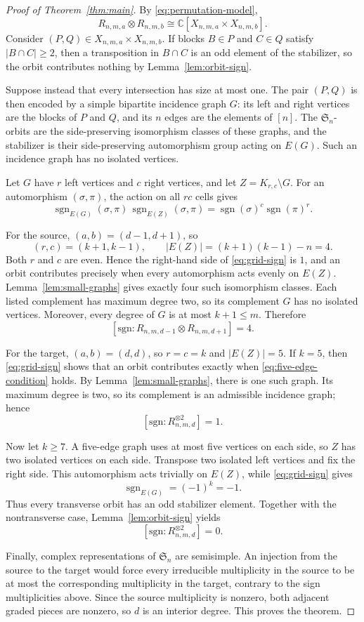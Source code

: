 \documentclass[11pt]{amsart}
\newcommand{\C}{\mathbb C}
\newcommand{\signrep}{\mathrm{sgn}}
\newcommand{\smult}[1]{[\signrep:#1]}
\DeclareMathOperator{\sgn}{sgn}
\begin{document}
\begin{proof}[Proof of Theorem~\ref{thm:main}]
By \eqref{eq:permutation-model},
\[
  R_{n,m,a}\otimes R_{n,m,b}
  \cong \C[X_{n,m,a}\times X_{n,m,b}].
\]
Consider $(P,Q)\in X_{n,m,a}\times X_{n,m,b}$. If blocks
$B\in P$ and $C\in Q$ satisfy $|B\cap C|\ge2$, then a transposition in
$B\cap C$ is an odd element of the stabilizer, so the orbit contributes
nothing by Lemma~\ref{lem:orbit-sign}.

Suppose instead that every intersection has size at most one. The pair
$(P,Q)$ is then encoded by a simple bipartite incidence graph $G$: its
left and right vertices are the blocks of $P$ and $Q$, and its $n$
edges are the elements of $[n]$. The $\mathfrak S_n$-orbits are the
side-preserving isomorphism classes of these graphs, and the stabilizer
is their side-preserving automorphism group acting on $E(G)$. Such an
incidence graph has no isolated vertices.

Let $G$ have $r$ left vertices and $c$ right vertices, and let
$Z=K_{r,c}\setminus G$. For an automorphism $(\sigma,\pi)$, the action
on all $rc$ cells gives
\begin{equation}\label{eq:grid-sign}
  \sgn_{E(G)}(\sigma,\pi)\,
  \sgn_{E(Z)}(\sigma,\pi)
  =\sgn(\sigma)^c\sgn(\pi)^r.
\end{equation}

For the source, $(a,b)=(d-1,d+1)$, so
\[
  (r,c)=(k+1,k-1),
  \qquad |E(Z)|=(k+1)(k-1)-n=4.
\]
Both $r$ and $c$ are even. Hence the right-hand side of
\eqref{eq:grid-sign} is $1$, and an orbit contributes precisely when
every automorphism acts evenly on $E(Z)$. Lemma~\ref{lem:small-graphs}
gives exactly four such isomorphism classes. Each listed complement
has maximum degree two, so its complement $G$ has no isolated vertices.
Moreover, every degree of $G$ is at most $k+1\le m$. Therefore
\[
  \smult{R_{n,m,d-1}\otimes R_{n,m,d+1}}=4.
\]

For the target, $(a,b)=(d,d)$, so $r=c=k$ and $|E(Z)|=5$. If $k=5$,
then \eqref{eq:grid-sign} shows that an orbit contributes exactly when
\eqref{eq:five-edge-condition} holds. By
Lemma~\ref{lem:small-graphs}, there is one such graph. Its maximum
degree is two, so its complement is an admissible incidence graph; hence
\[
  \smult{R_{n,m,d}^{\otimes2}}=1.
\]

Now let $k\ge7$. A five-edge graph uses at most five vertices on each
side, so $Z$ has two isolated vertices on each side. Transpose two
isolated left vertices and fix the right side. This automorphism acts
trivially on $E(Z)$, while \eqref{eq:grid-sign} gives
\[
  \sgn_{E(G)}=(-1)^k=-1.
\]
Thus every transverse orbit has an odd stabilizer element. Together
with the nontransverse case, Lemma~\ref{lem:orbit-sign} yields
\[
  \smult{R_{n,m,d}^{\otimes2}}=0.
\]

Finally, complex representations of $\mathfrak S_n$ are semisimple.
An injection from the source to the target would force every
irreducible multiplicity in the source to be at most the corresponding
multiplicity in the target, contrary to the sign multiplicities above.
Since the source multiplicity is nonzero, both adjacent graded pieces
are nonzero, so $d$ is an interior degree. This proves the theorem.
\end{proof}
\end{document}

